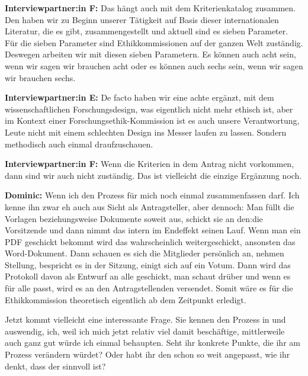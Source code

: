 \documentclass[a4paper,12pt,twoside]{scrreprt}
\begin{document}
\textbf{Interviewpartner:in F:} Das hängt auch mit dem Kriterienkatalog zusammen. Den haben wir zu Beginn unserer Tätigkeit auf Basis dieser internationalen Literatur, die es gibt, zusammengestellt und aktuell sind es sieben Parameter. Für die sieben Parameter sind Ethikkommissionen auf der ganzen Welt zuständig. Deswegen arbeiten wir mit diesen sieben Parametern. Es können auch acht sein, wenn wir sagen wir brauchen acht oder es können auch sechs sein, wenn wir sagen wir brauchen sechs.

\textbf{Interviewpartner:in E:} De facto haben wir eine achte ergänzt, mit dem wissenschaftlichen Forschungsdesign, was eigentlich nicht mehr ethisch ist, aber im Kontext einer Forschungsethik-Kommission ist es auch unsere Verantwortung, Leute nicht mit einem schlechten Design ins Messer laufen zu lassen. Sondern methodisch auch einmal draufzuschauen.

\textbf{Interviewpartner:in F:} Wenn die Kriterien in dem Antrag nicht vorkommen, dann sind wir auch nicht zuständig. Das ist vielleicht die einzige Ergänzung noch.

\textbf{Dominic:} Wenn ich den Prozess für mich noch einmal zusammenfassen darf. Ich kenne ihn zwar eh auch aus Sicht als Antragsteller, aber dennoch: Man füllt die Vorlagen beziehungsweise Dokumente soweit aus, schickt sie an den:die Vorsitzende und dann nimmt das intern im Endeffekt seinen Lauf. Wenn man ein PDF geschickt bekommt wird das wahrscheinlich weitergeschickt, ansonsten das Word-Dokument. Dann schauen es sich die Mitglieder persönlich an, nehmen Stellung, bespricht es in der Sitzung, einigt sich auf ein Votum. Dann wird das Protokoll davon als Entwurf an alle geschickt, man schaut drüber und wenn es für alle passt, wird es an den Antragstellenden versendet. Somit wäre es für die Ethikkommission theoretisch eigentlich ab dem Zeitpunkt erledigt.

Jetzt kommt vielleicht eine interessante Frage. Sie kennen den Prozess in und auswendig, ich, weil ich mich jetzt relativ viel damit beschäftige, mittlerweile auch ganz gut würde ich einmal behaupten. Seht ihr konkrete Punkte, die ihr am Prozess verändern würdet? Oder habt ihr den schon so weit angepasst, wie ihr denkt, dass der sinnvoll ist?
\end{document}
